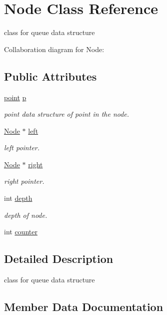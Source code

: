 \hypertarget{class_node}{}\section{Node Class Reference}
\label{class_node}


class for queue data structure  




Collaboration diagram for Node\+:
\subsection*{Public Attributes}
\begin{DoxyCompactItemize}
\item 
\hyperlink{structpoint}{point} \hyperlink{class_node_a4389b40ea26a0701517af65902423ac3}{p}
\begin{DoxyCompactList}\small\item\em point data structure of point in the node. \end{DoxyCompactList}\item 
\hyperlink{class_node}{Node} $\ast$ \hyperlink{class_node_ab8c667ac8fdb120ed4c031682a9cdaee}{left}
\begin{DoxyCompactList}\small\item\em left pointer. \end{DoxyCompactList}\item 
\hyperlink{class_node}{Node} $\ast$ \hyperlink{class_node_a7328862eaa6dea28018326549b3294d3}{right}
\begin{DoxyCompactList}\small\item\em right pointer. \end{DoxyCompactList}\item 
int \hyperlink{class_node_af6e81d5e83ccce40726a0d0ec6e0e359}{depth}
\begin{DoxyCompactList}\small\item\em depth of node. \end{DoxyCompactList}\item 
int \hyperlink{class_node_ae2392a7e4b94b16a648ea83423d2475d}{counter}
\end{DoxyCompactItemize}


\subsection{Detailed Description}
class for queue data structure 

\subsection{Member Data Documentation}
\mbox{\label{class_node_ae2392a7e4b94b16a648ea83423d2475d}} 
